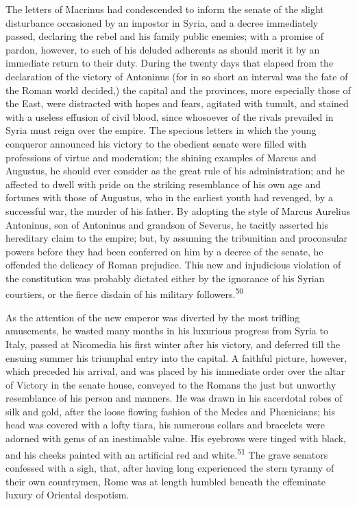 

The letters of Macrinus had condescended to inform the senate of
the slight disturbance occasioned by an impostor in Syria, and a
decree immediately passed, declaring the rebel and his family
public enemies; with a promise of pardon, however, to such of his
deluded adherents as should merit it by an immediate return to
their duty. During the twenty days that elapsed from the
declaration of the victory of Antoninus (for in so short an
interval was the fate of the Roman world decided,) the capital
and the provinces, more especially those of the East, were
distracted with hopes and fears, agitated with tumult, and
stained with a useless effusion of civil blood, since whosoever
of the rivals prevailed in Syria must reign over the empire. The
specious letters in which the young conqueror announced his
victory to the obedient senate were filled with professions of
virtue and moderation; the shining examples of Marcus and
Augustus, he should ever consider as the great rule of his
administration; and he affected to dwell with pride on the
striking resemblance of his own age and fortunes with those of
Augustus, who in the earliest youth had revenged, by a successful
war, the murder of his father. By adopting the style of Marcus
Aurelius Antoninus, son of Antoninus and grandson of Severus, he
tacitly asserted his hereditary claim to the empire; but, by
assuming the tribunitian and proconsular powers before they had
been conferred on him by a decree of the senate, he offended the
delicacy of Roman prejudice. This new and injudicious violation
of the constitution was probably dictated either by the ignorance
of his Syrian courtiers, or the fierce disdain of his military
followers.\textsuperscript{50}


As the attention of the new emperor was diverted by the most
trifling amusements, he wasted many months in his luxurious
progress from Syria to Italy, passed at Nicomedia his first
winter after his victory, and deferred till the ensuing summer
his triumphal entry into the capital. A faithful picture,
however, which preceded his arrival, and was placed by his
immediate order over the altar of Victory in the senate house,
conveyed to the Romans the just but unworthy resemblance of his
person and manners. He was drawn in his sacerdotal robes of silk
and gold, after the loose flowing fashion of the Medes and
Phœnicians; his head was covered with a lofty tiara, his numerous
collars and bracelets were adorned with gems of an inestimable
value. His eyebrows were tinged with black, and his cheeks
painted with an artificial red and white.\textsuperscript{51} The grave senators
confessed with a sigh, that, after having long experienced the
stern tyranny of their own countrymen, Rome was at length humbled
beneath the effeminate luxury of Oriental despotism.

